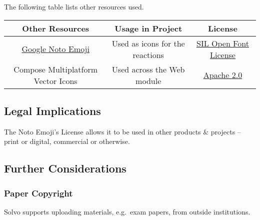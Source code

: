 \documentclass[a4paper]{article}
\begin{document}
    The following table lists other resources used.

    \begin{table}[H]
        \begin{tabular}{c|c|c}
            Other Resources                                                             & Usage in Project                & License                                                                                         \\
            \hline
            \href{https://fonts.google.com/noto/specimen/Noto+Emoji}{Google Noto Emoji} & Used as icons for the reactions & \href{https://scripts.sil.org/cms/scripts/page.php?site_id=nrsi\&         id=OFL}{SIL Open Font License} \\
            Compose Multiplatform Vector Icons                                          & Used across the Web module      & \href{https://github.com/JetBrains/compose-multiplatform/blob/master/LICENSE.txt}{Apache 2.0}   \\
        \end{tabular}
    \end{table}

    \subsection*{Legal Implications}

    The Noto Emoji's License allows it to be used in other products \& projects – print or digital, commercial or otherwise.

    \subsection*{Further Considerations}

    \subsubsection*{Paper Copyright}

    Solvo supports uploading materials, e.g.\ exam papers, from outside institutions.
\end{document}
